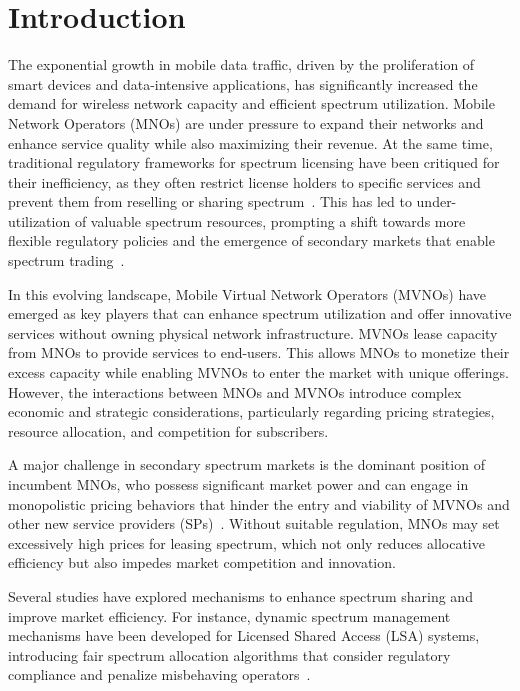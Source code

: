 \documentclass[12pt, draftclsnofoot, onecolumn]{IEEEtran}
\begin{document}
	\section{Introduction}
	The exponential growth in mobile data traffic, driven by the proliferation of smart devices and data-intensive applications, has significantly increased the demand for wireless network capacity and efficient spectrum utilization. Mobile Network Operators (MNOs) are under pressure to expand their networks and enhance service quality while also maximizing their revenue. At the same time, traditional regulatory frameworks for spectrum licensing have been critiqued for their inefficiency, as they often restrict license holders to specific services and prevent them from reselling or sharing spectrum~\cite{Daoud10,Matinmikko20}. This has led to under-utilization of valuable spectrum resources, prompting a shift towards more flexible regulatory policies and the emergence of secondary markets that enable spectrum trading~\cite{Daoud10,Alsaedi,Matinmikko20,Book-Y-Wu}. 
	
	In this evolving landscape, Mobile Virtual Network Operators (MVNOs) have emerged as key players that can enhance spectrum utilization and offer innovative services without owning physical network infrastructure. MVNOs lease capacity from MNOs to provide services to end-users. This allows MNOs to monetize their excess capacity while enabling MVNOs to enter the market with unique offerings. However, the interactions between MNOs and MVNOs introduce complex economic and strategic considerations, particularly regarding pricing strategies, resource allocation, and competition for subscribers.
	
	A major challenge in secondary spectrum markets is the dominant position of incumbent MNOs, who possess significant market power and can engage in monopolistic pricing behaviors that hinder the entry and viability of MVNOs and other new service providers (SPs)~\cite{Posner17,Weyl22,Weyl16,Gamvrelis2023,Fazeli24}. Without suitable regulation, MNOs may set excessively high prices for leasing spectrum, which not only reduces allocative efficiency but also impedes market competition and innovation.
	
	Several studies have explored mechanisms to enhance spectrum sharing and improve market efficiency. For instance, dynamic spectrum management mechanisms have been developed for Licensed Shared Access (LSA) systems, introducing fair spectrum allocation algorithms that consider regulatory compliance and penalize misbehaving operators~\cite{Butt18}.
	
\end{document}
